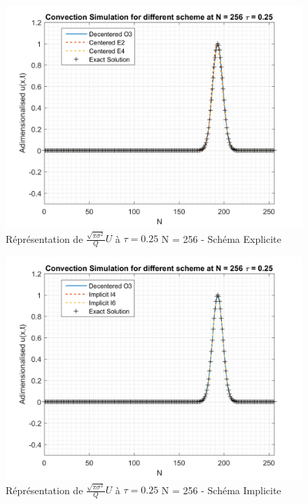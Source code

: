 \documentclass{article}
\begin{document}
\begin{figure}[H]
    \centering
    \includegraphics[scale=0.45]{img/fig4a1.png}
    \caption{Réprésentation de $\frac{\sqrt{\pi \sigma^2}}{Q} U$ à $\tau = 0.25$ N = 256 - Schéma Explicite}
    \label{fig4a1}
\end{figure}
\begin{figure}[H]
    \centering
    \includegraphics[scale=0.45]{img/fig4a2.png}
    \caption{Réprésentation de $\frac{\sqrt{\pi \sigma^2}}{Q} U$ à $\tau = 0.25$ N = 256 - Schéma Implicite}
    \label{fig4a2}
\end{figure}
\end{document}
